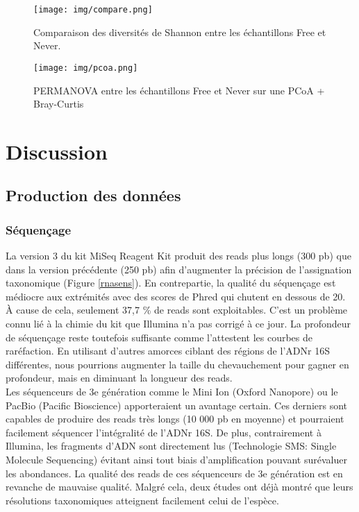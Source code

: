 \documentclass[12pt,a4paper]{article}
\begin{document}
\begin{figure}[H]
\begin{center}
\texttt{[image: img/compare.png]}\hfill
\end{center}
\caption{Comparaison des diversités de Shannon entre les échantillons Free et Never.}
\label{compare}
\end{figure}


\begin{figure}[H]
\begin{center}
\texttt{[image: img/pcoa.png]}\hfill
\end{center}
\caption{PERMANOVA entre les échantillons Free et Never sur une PCoA + Bray-Curtis}
\label{pcoa}
\end{figure}

\newpage
\section{Discussion}
\subsection{Production des données}
\subsubsection{Séquençage}
La version 3 du kit MiSeq Reagent Kit produit des reads plus longs (300 pb) que dans la version précédente (250 pb) afin d'augmenter la précision de l'assignation taxonomique (Figure \ref{rnasens}). En contrepartie, la qualité du séquençage est médiocre aux extrémités avec des scores de Phred qui chutent en dessous de 20. À cause de cela, seulement 37,7 \% de reads sont exploitables.
C'est un problème connu lié à la chimie du kit que Illumina n'a pas corrigé à ce jour. La profondeur de séquençage reste toutefois suffisante comme l'attestent les courbes de raréfaction. En utilisant d'autres amorces ciblant des régions de l'ADNr 16S différentes, nous pourrions augmenter la taille du chevauchement pour gagner en profondeur, mais en diminuant la longueur des reads. \\
Les séquenceurs de 3e génération comme le Mini Ion (Oxford Nanopore) ou le PacBio (Pacific Bioscience) apporteraient un avantage certain. Ces derniers sont capables de produire des reads très longs (10 000 pb en moyenne) et pourraient facilement séquencer l'intégralité de l'ADNr 16S. De plus, contrairement à Illumina, les fragments d'ADN sont directement lus (Technologie SMS: Single Molecule Sequencing) évitant ainsi tout biais d'amplification pouvant surévaluer les abondances.
La qualité des reads de ces séquenceurs de 3e génération est en revanche de mauvaise qualité. Malgré cela, deux études\cite{Wagner2016,Benitez-Paez2016} ont déjà montré que leurs résolutions taxonomiques atteignent facilement celui de l’espèce.
\end{document}
